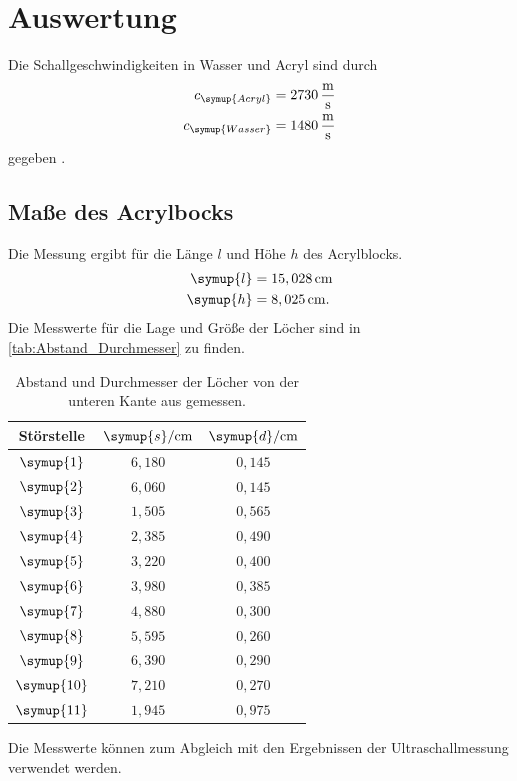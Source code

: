 \section{Auswertung}
\label{sec:Auswertung}
Die Schallgeschwindigkeiten in Wasser und Acryl sind durch
\begin{align*}
  c_{\symup{Acryl}} &= 2730\,\unit{\meter\per\second}\\
  c_{\symup{Wasser}}  &= 1480\,\unit{\meter\per\second}
\end{align*}
gegeben \cite{schallgeschwindigkeit}.

\subsection{Maße des Acrylbocks}
Die Messung ergibt für die Länge $l$ und Höhe $h$ des Acrylblocks.
\begin{align*}
  \symup{l} &= 15,028\,\unit{\centi\meter}\\
  \symup{h} &= 8,025\,\unit{\centi\meter}.
\end{align*}
Die Messwerte für die Lage und Größe der Löcher sind in \autoref{tab:Abstand_Durchmesser} zu finden.
\begin{table}
  \centering
  \begin{tabular}{c c c}
    \toprule
    Störstelle & $\symup{s}/\unit{\centi\meter}$ & $\symup{d}/\unit{\centi\meter}$\\
    \midrule
    $\symup{1}  $ & $6,180$ & $0,145$ \\
    $\symup{2}  $ & $6,060$ & $0,145$ \\
    $\symup{3}  $ & $1,505$ & $0,565$ \\
    $\symup{4}  $ & $2,385$ & $0,490$ \\
    $\symup{5}  $ & $3,220$ & $0,400$ \\
    $\symup{6}  $ & $3,980$ & $0,385$ \\
    $\symup{7}  $ & $4,880$ & $0,300$ \\
    $\symup{8}  $ & $5,595$ & $0,260$ \\
    $\symup{9}  $ & $6,390$ & $0,290$ \\
    $\symup{10} $ & $7,210$ & $0,270$ \\
    $\symup{11} $ & $1,945$ & $0,975$ \\
    \bottomrule
  \end{tabular}
  \caption{Abstand und Durchmesser der Löcher von der unteren Kante aus gemessen.}
  \label{tab:Abstand_Durchmesser}
\end{table}
Die Messwerte können zum Abgleich mit den Ergebnissen der Ultraschallmessung verwendet werden.

